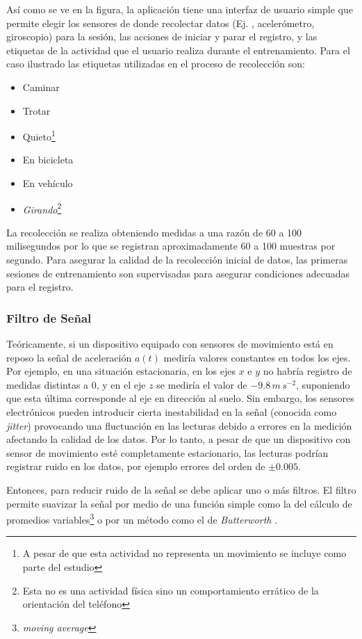 Así como se ve en la figura, la aplicación tiene una interfaz de usuario
simple que permite elegir los sensores de donde recolectar datos (Ej.
, acelerómetro, giroscopio) para la sesión, las acciones
de iniciar y parar el registro, y las etiquetas de la actividad que
el usuario realiza durante el entrenamiento. Para el caso ilustrado
las etiquetas utilizadas en el proceso de recolección son:
\begin{itemize}
\item Caminar
\item Trotar
\item Quieto\footnote{A pesar de que esta actividad no representa un movimiento se incluye
como parte del estudio}
\item En bicicleta
\item En vehículo
\item \emph{Girando}\footnote{Esta no es una actividad física sino un comportamiento errático de
la orientación del teléfono}
\end{itemize}
La recolección se realiza obteniendo medidas a una razón de 60 a 100
milisegundos por lo que se registran aproximadamente 60 a 100 muestras
por segundo. Para asegurar la calidad de la recolección inicial de
datos, las primeras sesiones de entrenamiento son supervisadas para
asegurar condiciones adecuadas para el registro.

\subsubsection{Filtro de Señal}

\label{ssec44:filtering}Teóricamente, si un dispositivo equipado
con sensores de movimiento está en reposo la señal de aceleración
$a(t)$ mediría valores constantes en todos los ejes. Por ejemplo,
en una situación estacionaria, en los ejes $x$ e $y$ no habría registro
de medidas distintas a $0$, y en el eje $z$ se mediría el valor
de $-9.8\,m\,s^{-2}$, suponiendo que esta última corresponde al eje
en dirección al suelo. Sin embargo, los sensores electrónicos pueden
introducir cierta inestabilidad en la señal (conocida como \emph{jitter})
provocando una fluctuación en las lecturas debido a errores en la
medición afectando la calidad de los datos. Por lo tanto, a pesar
de que un dispositivo con sensor de movimiento esté completamente
estacionario, las lecturas podrían registrar ruido en los datos, por
ejemplo errores del orden de $\pm0.005$. 

Entonces, para reducir ruido de la señal se debe aplicar uno o más
filtros. El filtro permite suavizar la señal por medio de una función
simple como la del cálculo de promedios variables\footnote{\emph{moving average}}
o por un método como el de \emph{Butterworth} \cite{ReyesOrtiz2015}. 

